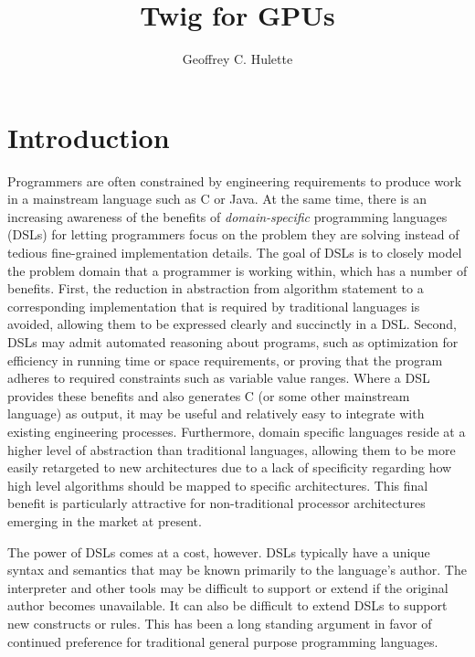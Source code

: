 \documentclass[11pt]{article}
\title{Twig for GPUs}
\author{Geoffrey C. Hulette}  %
\begin{document}
\maketitle
\thispagestyle{empty}

\section{Introduction}

Programmers are often constrained by engineering requirements to produce work
in a mainstream language such as C or Java. At the same time, there is an
increasing awareness of the benefits of \emph{domain-specific} programming
languages (DSLs) for letting programmers focus on the problem they are solving
instead of tedious fine-grained implementation details. The goal of DSLs is to
closely model the problem domain that a programmer is working within, which
has a number of benefits. First, the reduction in abstraction from algorithm
statement to a corresponding implementation that is required by traditional
languages is avoided, allowing them to be expressed clearly and succinctly in
a DSL. Second, DSLs may admit automated reasoning about programs, such as
optimization for efficiency in running time or space requirements, or proving
that the program adheres to required constraints such as variable value
ranges. Where a DSL provides these benefits and also generates C (or some
other mainstream language) as output, it may be useful and relatively easy to
integrate with existing engineering processes. Furthermore, domain specific
languages reside at a higher level of abstraction than traditional languages,
allowing them to be more easily retargeted to new architectures due to a lack
of specificity regarding how high level algorithms should be mapped to
specific architectures. This final benefit is particularly attractive for
non-traditional processor architectures emerging in the market at present.

The power of DSLs comes at a cost, however. DSLs typically have a unique
syntax and semantics that may be known primarily to the language's author. The
interpreter and other tools may be difficult to support or extend if the
original author becomes unavailable. It can also be difficult to extend DSLs
to support new constructs or rules. This has been a long standing argument
in favor of continued preference for traditional general purpose programming
languages.

\end{document}
